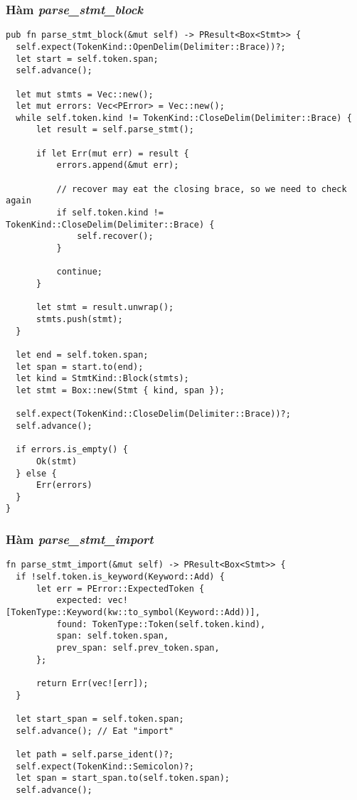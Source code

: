 {\subsubsection{Hàm \textit{parse\_stmt\_block}}
\label{ap1:stmt_block}
\begin{lstlisting}
pub fn parse_stmt_block(&mut self) -> PResult<Box<Stmt>> {
  self.expect(TokenKind::OpenDelim(Delimiter::Brace))?;
  let start = self.token.span;
  self.advance();

  let mut stmts = Vec::new();
  let mut errors: Vec<PError> = Vec::new();
  while self.token.kind != TokenKind::CloseDelim(Delimiter::Brace) {
      let result = self.parse_stmt();

      if let Err(mut err) = result {
          errors.append(&mut err);

          // recover may eat the closing brace, so we need to check again
          if self.token.kind != TokenKind::CloseDelim(Delimiter::Brace) {
              self.recover();
          }

          continue;
      }

      let stmt = result.unwrap();
      stmts.push(stmt);
  }

  let end = self.token.span;
  let span = start.to(end);
  let kind = StmtKind::Block(stmts);
  let stmt = Box::new(Stmt { kind, span });

  self.expect(TokenKind::CloseDelim(Delimiter::Brace))?;
  self.advance();

  if errors.is_empty() {
      Ok(stmt)
  } else {
      Err(errors)
  }
}
\end{lstlisting}

\subsubsection{Hàm \textit{parse\_stmt\_import}}
\label{ap1:stmt_add}
\begin{lstlisting}
fn parse_stmt_import(&mut self) -> PResult<Box<Stmt>> {
  if !self.token.is_keyword(Keyword::Add) {
      let err = PError::ExpectedToken {
          expected: vec![TokenType::Keyword(kw::to_symbol(Keyword::Add))],
          found: TokenType::Token(self.token.kind),
          span: self.token.span,
          prev_span: self.prev_token.span,
      };

      return Err(vec![err]);
  }

  let start_span = self.token.span;
  self.advance(); // Eat "import"

  let path = self.parse_ident()?;
  self.expect(TokenKind::Semicolon)?;
  let span = start_span.to(self.token.span);
  self.advance();


\end{lstlisting}}
